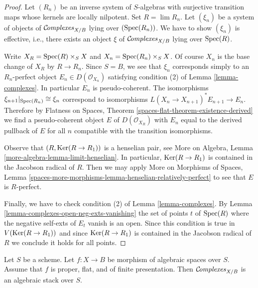 \begin{proof}
Let $(R_n)$ be an inverse system of $S$-algebras with surjective transition
maps whose kernels are locally nilpotent. Set $R = \lim R_n$.
Let $(\xi_n)$ be a system of objects of $\mathcal{C}\!\mathit{omplexes}_{X/B}$
lying over $(\mathop{\mathrm{Spec}}(R_n))$. We have to show $(\xi_n)$ is effective, i.e.,
there exists an object $\xi$ of $\mathcal{C}\!\mathit{omplexes}_{X/B}$ lying over
$\mathop{\mathrm{Spec}}(R)$.

\medskip\noindent
Write $X_R = \mathop{\mathrm{Spec}}(R) \times_S X$ and $X_n = \mathop{\mathrm{Spec}}(R_n) \times_S X$.
Of course $X_n$ is the base change of $X_R$ by $R \to R_n$. Since $S = B$,
we see that $\xi_n$ corresponds simply to an $R_n$-perfect object
$E_n \in D(\mathcal{O}_{X_n})$ satisfying condition (2) of
Lemma \ref{lemma-complexes}. In particular $E_n$ is pseudo-coherent.
The isomorphisms $\xi_{n + 1}|_{\mathop{\mathrm{Spec}}(R_n)} \cong \xi_n$
correspond to isomorphisms $L(X_n \to X_{n + 1})^*E_{n + 1} \to E_n$.
Therefore by
Flatness on Spaces, Theorem \ref{spaces-flat-theorem-existence-derived}
we find a pseudo-coherent object $E$ of $D(\mathcal{O}_{X_R})$
with $E_n$ equal to the derived pullback of $E$ for all $n$
compatible with the transition isomorphisms.

\medskip\noindent
Observe that $(R, \mathop{\mathrm{Ker}}(R \to R_1))$ is a henselian pair, see
More on Algebra, Lemma \ref{more-algebra-lemma-limit-henselian}.
In particular, $\mathop{\mathrm{Ker}}(R \to R_1)$ is contained in the Jacobson radical of $R$.
Then we may apply More on Morphisms of Spaces, Lemma
\ref{spaces-more-morphisms-lemma-henselian-relatively-perfect}
to see that $E$ is $R$-perfect.

\medskip\noindent
Finally, we have to check condition (2) of Lemma \ref{lemma-complexes}.
By Lemma \ref{lemma-complexes-open-neg-exts-vanishing}
the set of points $t$ of $\mathop{\mathrm{Spec}}(R)$ where the negative self-exts of $E_t$
vanish is an open. Since this condition is true in $V(\mathop{\mathrm{Ker}}(R \to R_1))$
and since $\mathop{\mathrm{Ker}}(R \to R_1)$ is contained in the Jacobson radical of $R$
we conclude it holds for all points.
\end{proof}

\begin{theorem}
\label{theorem-complexes-algebraic}
\begin{reference}
\cite{lieblich-complexes}
\end{reference}
Let $S$ be a scheme. Let $f : X \to B$ be morphism of algebraic spaces
over $S$. Assume that $f$ is proper, flat, and of finite presentation.
Then $\mathcal{C}\!\mathit{omplexes}_{X/B}$ is an algebraic stack over $S$.
\end{theorem}

